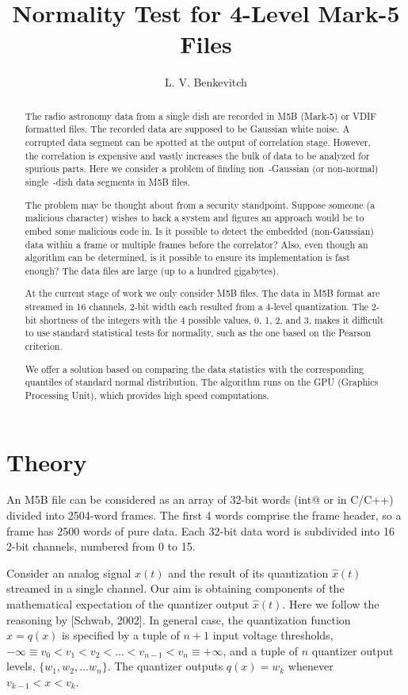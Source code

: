 \documentclass[letterpaper,twoside,12pt]{article}
\title{Normality Test for 4-Level Mark-5 Files}
\author[1]{L. V. Benkevitch}
\affil[1]{\small MIT Haystack observatory, Westford, MA 01886, USA.}
\begin{document}
\maketitle

\begin{abstract}
The radio astronomy data from a single dish are recorded in M5B (Mark-5) or VDIF formatted files. The recorded data are supposed to be Gaussian white noise. A corrupted data segment can be spotted at the output of correlation stage. However, the correlation is expensive and vastly increases the bulk of data to be analyzed for spurious parts. Here we consider a problem of finding non~-Gaussian (or non-normal) single~-dish data segments in M5B files.

The problem may be thought about from a security standpoint. Suppose someone (a malicious character) wishes to hack a system and figures an approach would be to embed some malicious code in. Is it possible to detect the embedded (non-Gaussian) data within a frame or multiple frames before the correlator? Also, even though an algorithm can be determined, is it possible to ensure its implementation is fast enough? The data files are large (up to a hundred gigabytes).

At the current stage of work we only consider M5B files. The data in M5B format are streamed in 16 channels, 2-bit width each resulted from a 4-level quantization. The 2-bit shortness of the integers with the 4 possible values, 0, 1, 2, and 3, makes it difficult to use standard statistical tests for normality, such as the one based on the Pearson criterion.     
 
We offer a solution based on comparing the data statistics with the corresponding quantiles of standard normal distribution. The algorithm runs on the GPU (Graphics Processing Unit), which provides high speed computations.
\end{abstract}


\section{Theory}

An M5B file can be considered as an array of 32-bit words (\verb@unsigned int@ or  \verb@uint@ in C/C++) divided into 2504-word frames. The first 4 words comprise the frame header, so a frame has 2500 words of pure data. Each 32-bit data word is subdivided into 16 2-bit channels, numbered from 0 to 15. 

Consider an analog signal $x(t)$ and the result of its quantization $\hat{x}(t)$ streamed in a single channel. Our aim is obtaining components of the mathematical expectation of the quantizer output $\hat{x}(t)$. Here we follow the reasoning by [Schwab, 2002]. In general case, the quantization function $\hat{x} = q(x)$ is specified by a tuple of $n+1$ input voltage thresholds, 
$-\infty \equiv v_0 < v_1 < v_2 < \ldots  < v_{n-1} < v_n \equiv +\infty$, and a tuple of $n$ quantizer output levels, $\{ w_1, w_2, \ldots w_n \}$. The quantizer outputs $q(x) = w_k$ whenever $v_{k-1} < x < v_k$.
\end{document}
